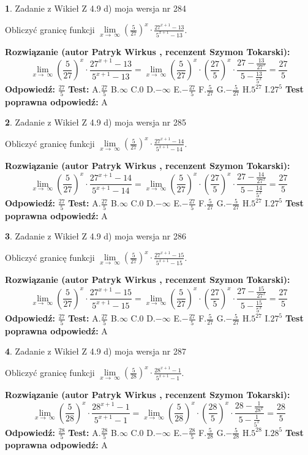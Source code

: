 \documentclass[12pt, a4paper]{article}
\theoremstyle{definition} %
\newtheorem{zad}{}
\newcommand{\zadStart}[1]{\begin{zad}#1\newline}
\newcommand{\zadStop}{\end{zad}}
\newcommand{\rozwStart}[2]{\noindent \textbf{Rozwiązanie (autor #1 , recenzent #2): }\newline}
\newcommand{\rozwStop}{\newline}
\newcommand{\odpStart}{\noindent \textbf{Odpowiedź:}\newline}
\newcommand{\odpStop}{\newline}
\newcommand{\testStart}{\noindent \textbf{Test:}\newline}
\newcommand{\testStop}{\newline}
\newcommand{\kluczStart}{\noindent \textbf{Test poprawna odpowiedź:}\newline}
\newcommand{\kluczStop}{\newline}
\begin{document}
\zadStart{Zadanie z Wikieł Z 4.9 d) moja wersja nr 284}


Obliczyć granicę funkcji  $\lim\limits_{x\to\ \infty}(\frac{5}{27})^{x}\cdot\frac{27^{x+1}-13}{5^{x+1}-13}$.
\zadStop
\rozwStart{Patryk Wirkus}{Szymon Tokarski}
$$\lim\limits_{x\to\ \infty}(\frac{5}{27})^{x}\cdot\frac{27^{x+1}-13}{5^{x+1}-13}=\lim\limits_{x\to\ \infty}(\frac{5}{27})^{x}\cdot(\frac{27}{5})^{x} \cdot \frac{27-\frac{13}{27^{x}}}{5-\frac{13}{5^{x}}} = \frac{27}{5}$$
\rozwStop
\odpStart
$\frac{27}{5}$
\odpStop
\testStart
A.$\frac{27}{5}$ B.$\infty$ C.$0$ D.$-\infty$ E.$-\frac{27}{5}$
F.$\frac{5}{27}$ G.$-\frac{5}{27}$
H.$5^{27}$
I.$27^{5}$
\testStop
\kluczStart
A
\kluczStop



\zadStart{Zadanie z Wikieł Z 4.9 d) moja wersja nr 285}


Obliczyć granicę funkcji  $\lim\limits_{x\to\ \infty}(\frac{5}{27})^{x}\cdot\frac{27^{x+1}-14}{5^{x+1}-14}$.
\zadStop
\rozwStart{Patryk Wirkus}{Szymon Tokarski}
$$\lim\limits_{x\to\ \infty}(\frac{5}{27})^{x}\cdot\frac{27^{x+1}-14}{5^{x+1}-14}=\lim\limits_{x\to\ \infty}(\frac{5}{27})^{x}\cdot(\frac{27}{5})^{x} \cdot \frac{27-\frac{14}{27^{x}}}{5-\frac{14}{5^{x}}} = \frac{27}{5}$$
\rozwStop
\odpStart
$\frac{27}{5}$
\odpStop
\testStart
A.$\frac{27}{5}$ B.$\infty$ C.$0$ D.$-\infty$ E.$-\frac{27}{5}$
F.$\frac{5}{27}$ G.$-\frac{5}{27}$
H.$5^{27}$
I.$27^{5}$
\testStop
\kluczStart
A
\kluczStop



\zadStart{Zadanie z Wikieł Z 4.9 d) moja wersja nr 286}


Obliczyć granicę funkcji  $\lim\limits_{x\to\ \infty}(\frac{5}{27})^{x}\cdot\frac{27^{x+1}-15}{5^{x+1}-15}$.
\zadStop
\rozwStart{Patryk Wirkus}{Szymon Tokarski}
$$\lim\limits_{x\to\ \infty}(\frac{5}{27})^{x}\cdot\frac{27^{x+1}-15}{5^{x+1}-15}=\lim\limits_{x\to\ \infty}(\frac{5}{27})^{x}\cdot(\frac{27}{5})^{x} \cdot \frac{27-\frac{15}{27^{x}}}{5-\frac{15}{5^{x}}} = \frac{27}{5}$$
\rozwStop
\odpStart
$\frac{27}{5}$
\odpStop
\testStart
A.$\frac{27}{5}$ B.$\infty$ C.$0$ D.$-\infty$ E.$-\frac{27}{5}$
F.$\frac{5}{27}$ G.$-\frac{5}{27}$
H.$5^{27}$
I.$27^{5}$
\testStop
\kluczStart
A
\kluczStop



\zadStart{Zadanie z Wikieł Z 4.9 d) moja wersja nr 287}


Obliczyć granicę funkcji  $\lim\limits_{x\to\ \infty}(\frac{5}{28})^{x}\cdot\frac{28^{x+1}-1}{5^{x+1}-1}$.
\zadStop
\rozwStart{Patryk Wirkus}{Szymon Tokarski}
$$\lim\limits_{x\to\ \infty}(\frac{5}{28})^{x}\cdot\frac{28^{x+1}-1}{5^{x+1}-1}=\lim\limits_{x\to\ \infty}(\frac{5}{28})^{x}\cdot(\frac{28}{5})^{x} \cdot \frac{28-\frac{1}{28^{x}}}{5-\frac{1}{5^{x}}} = \frac{28}{5}$$
\rozwStop
\odpStart
$\frac{28}{5}$
\odpStop
\testStart
A.$\frac{28}{5}$ B.$\infty$ C.$0$ D.$-\infty$ E.$-\frac{28}{5}$
F.$\frac{5}{28}$ G.$-\frac{5}{28}$
H.$5^{28}$
I.$28^{5}$
\testStop
\kluczStart
A
\kluczStop
\end{document}
